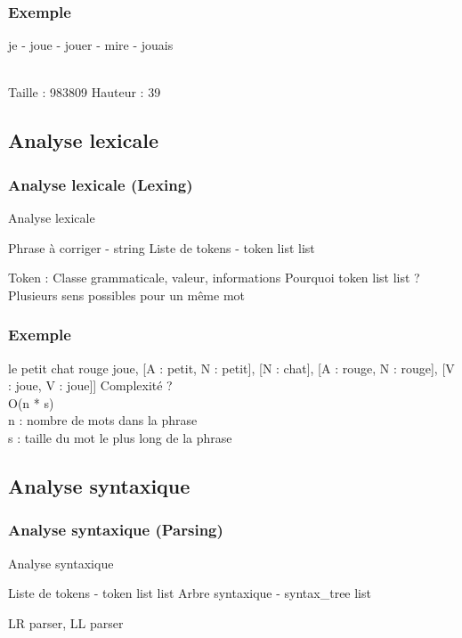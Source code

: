 \documentclass{beamer}
\begin{document}
\begin{frame}
   \frametitle{Exemple}
   \begin{center}
   je - joue - jouer - mire - jouais\\
   \end{center}
   \centering
   \\
   Taille : 983809 \; \; Hauteur : 39
\end{frame}

\subsection{Analyse lexicale}
\begin{frame}
   \frametitle{Analyse lexicale (Lexing)}
   \begin{algorithm}[H]
      \caption{Analyse lexicale}
      \begin{algorithmic}
         \Require Phrase à corriger - string
         \Ensure Liste de tokens - token list list
      \end{algorithmic}
   \end{algorithm}
   Token : Classe grammaticale, valeur, informations\bigbreak
   Pourquoi token list list ?\\
   Plusieurs sens possibles pour un même mot
\end{frame}

\begin{frame}
   \frametitle{Exemple}
   le petit chat rouge joue\bigbreak
   [[D : le, Ov : le],
    [A : petit, N : petit],
    [N : chat],
    [A : rouge, N : rouge],
    [V : joue, V : joue]]
   \bigbreak
   Complexité ?\\
   O(n * s)\\
   n : nombre de mots dans la phrase\\
   s : taille du mot le plus long de la phrase
\end{frame}

\subsection{Analyse syntaxique}
\begin{frame}
   \frametitle{Analyse syntaxique (Parsing)}
   \begin{algorithm}[H]
      \caption{Analyse syntaxique}
      \begin{algorithmic}
         \Require Liste de tokens - token list list
         \Ensure Arbre syntaxique - syntax\_tree list
      \end{algorithmic}
   \end{algorithm}
   \bigbreak
   LR parser, LL parser
\end{frame}
\end{document}
